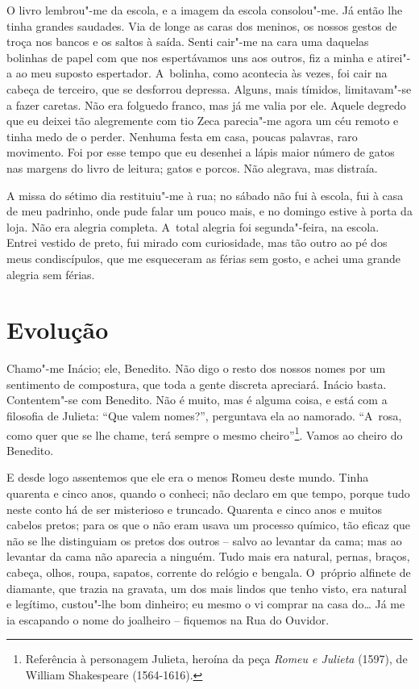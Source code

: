 O livro lembrou"-me da escola, e a imagem da escola consolou"-me. Já então
lhe tinha grandes saudades. Via de longe as caras dos meninos, os nossos
gestos de troça nos bancos e os saltos à saída. Senti cair"-me na cara
uma daquelas bolinhas de papel com que nos espertávamos uns aos outros,
fiz a minha e atirei"-a ao meu suposto espertador. A~bolinha, como
acontecia às vezes, foi cair na cabeça de terceiro, que se desforrou
depressa. Alguns, mais tímidos, limitavam"-se a fazer caretas. Não era
folguedo franco, mas já me valia por ele. Aquele degredo que eu deixei
tão alegremente com tio Zeca parecia"-me agora um céu remoto e tinha medo
de o perder. Nenhuma festa em casa, poucas palavras, raro movimento. Foi
por esse tempo que eu desenhei a lápis maior número de gatos nas margens
do livro de leitura; gatos e porcos. Não alegrava, mas distraía.

A missa do sétimo dia restituiu"-me à rua; no sábado não fui à escola,
fui à casa de meu padrinho, onde pude falar um pouco mais, e no domingo
estive à porta da loja. Não era alegria completa. A~total alegria foi
segunda"-feira, na escola. Entrei vestido de preto, fui mirado com
curiosidade, mas tão outro ao pé dos meus condiscípulos, que me
esqueceram as férias sem gosto, e achei uma grande alegria sem férias.

\chapter{Evolução}

Chamo"-me Inácio; ele, Benedito. Não digo o resto dos nossos nomes por um
sentimento de compostura, que toda a gente discreta apreciará. Inácio
basta. Contentem"-se com Benedito. Não é muito, mas é alguma coisa, e
está com a filosofia de Julieta: ``Que valem nomes?'', perguntava ela ao
namorado. ``A~rosa, como quer que se lhe chame, terá sempre o mesmo
cheiro''\footnote{Referência à personagem Julieta, heroína da peça
  \emph{Romeu e Julieta} (1597), de William Shakespeare (1564-1616).}.
Vamos ao cheiro do Benedito.

E desde logo assentemos que ele era o menos Romeu deste mundo. Tinha
quarenta e cinco anos, quando o conheci; não declaro em que tempo,
porque tudo neste conto há de ser misterioso e truncado. Quarenta e
cinco anos e muitos cabelos pretos; para os que o não eram usava um
processo químico, tão eficaz que não se lhe distinguiam os pretos dos
outros -- salvo ao levantar da cama; mas ao levantar da cama não
aparecia a ninguém. Tudo mais era natural, pernas, braços, cabeça,
olhos, roupa, sapatos, corrente do relógio e bengala. O~próprio alfinete
de diamante, que trazia na gravata, um dos mais lindos que tenho visto,
era natural e legítimo, custou"-lhe bom dinheiro; eu mesmo o vi comprar
na casa do\ldots{} Já me ia escapando o nome do joalheiro -- fiquemos na Rua
do Ouvidor.


